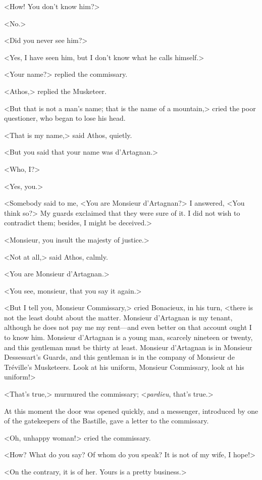 <How! You don't know him?> 

<No.> 

<Did you never see him?> 

<Yes, I have seen him, but I don't know what he calls himself.> 

<Your name?> replied the commissary. 

<Athos,> replied the Musketeer. 

<But that is not a man's name; that is the name of a mountain,> cried the poor questioner, who began to lose his head. 

<That is my name,> said Athos, quietly. 

<But you said that your name was d'Artagnan.> 

<Who, I?> 

<Yes, you.> 

<Somebody said to me, <You are Monsieur d'Artagnan?> I answered, <You think so?> My guards exclaimed that they were sure of it. I did not wish to contradict them; besides, I might be deceived.> 

<Monsieur, you insult the majesty of justice.> 

<Not at all,> said Athos, calmly. 

<You are Monsieur d'Artagnan.> 

<You see, monsieur, that you say it again.> 

<But I tell you, Monsieur Commissary,> cried Bonacieux, in his turn, <there is not the least doubt about the matter. Monsieur d'Artagnan is my tenant, although he does not pay me my rent---and even better on that account ought I to know him. Monsieur d'Artagnan is a young man, scarcely nineteen or twenty, and this gentleman must be thirty at least. Monsieur d'Artagnan is in Monsieur Dessessart's Guards, and this gentleman is in the company of Monsieur de Tréville's Musketeers. Look at his uniform, Monsieur Commissary, look at his uniform!> 

<That's true,> murmured the commissary; <\textit{pardieu}, that's true.> 

At this moment the door was opened quickly, and a messenger, introduced by one of the gatekeepers of the Bastille, gave a letter to the commissary. 

<Oh, unhappy woman!> cried the commissary. 

<How? What do you say? Of whom do you speak? It is not of my wife, I hope!> 

<On the contrary, it is of her. Yours is a pretty business.> 

